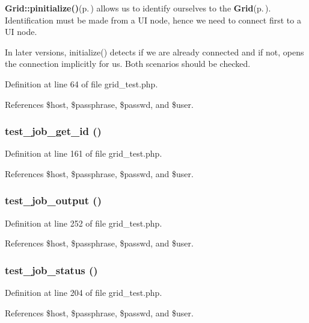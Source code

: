 {\bf Grid::pinitialize()}{\rm (p.\,\pageref{classGrid_a11})} allows us to identify ourselves to the {\bf Grid}{\rm (p.\,\pageref{classGrid})}. Identification must be made from a UI node, hence we need to connect first to a UI node.

In later versions, initialize() detects if we are already connected and if not, opens the connection implicitly for us. Both scenarios should be checked. 

Definition at line 64 of file grid\_\-test.php.

References \$host, \$passphrase, \$passwd, and \$user.
\subsubsection{\setlength{\rightskip}{0pt plus 5cm}test\_\-job\_\-get\_\-id ()}\label{grid__test_8php_a12}




Definition at line 161 of file grid\_\-test.php.

References \$host, \$passphrase, \$passwd, and \$user.
\subsubsection{\setlength{\rightskip}{0pt plus 5cm}test\_\-job\_\-output ()}\label{grid__test_8php_a16}




Definition at line 252 of file grid\_\-test.php.

References \$host, \$passphrase, \$passwd, and \$user.
\subsubsection{\setlength{\rightskip}{0pt plus 5cm}test\_\-job\_\-status ()}\label{grid__test_8php_a14}




Definition at line 204 of file grid\_\-test.php.

References \$host, \$passphrase, \$passwd, and \$user.
